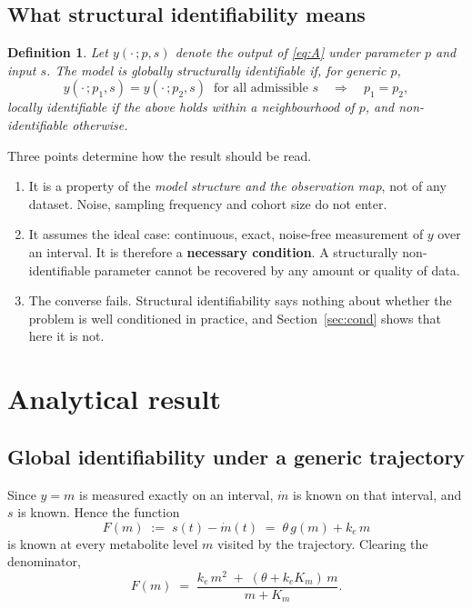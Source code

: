 \documentclass[11pt,a4paper]{article}
\newtheorem{definition}{Definition}
\begin{document}
\subsection{What structural identifiability means}

\begin{definition}
Let $y(\cdot\,; p, s)$ denote the output of \eqref{eq:A} under parameter $p$ and input $s$.
The model is \emph{globally structurally identifiable} if, for generic $p$,
\[
y(\cdot\,; p_1, s) = y(\cdot\,; p_2, s) \ \text{ for all admissible } s
\quad \Longrightarrow \quad p_1 = p_2 ,
\]
\emph{locally identifiable} if the above holds within a neighbourhood of $p$, and
\emph{non-identifiable} otherwise.
\end{definition}

Three points determine how the result should be read.

\begin{enumerate}[leftmargin=*, itemsep=2pt]
\item It is a property of the \emph{model structure and the observation map}, not of any
      dataset. Noise, sampling frequency and cohort size do not enter.
\item It assumes the ideal case: continuous, exact, noise-free measurement of $y$ over an
      interval. It is therefore a \textbf{necessary condition}. A structurally
      non-identifiable parameter cannot be recovered by any amount or quality of data.
\item The converse fails. Structural identifiability says nothing about whether the
      problem is well conditioned in practice, and Section~\ref{sec:cond} shows that here
      it is not.
\end{enumerate}

\section{Analytical result}

\subsection{Global identifiability under a generic trajectory}

Since $y = m$ is measured exactly on an interval, $\dot m$ is known on that interval, and
$s$ is known. Hence the function
\begin{equation}
F(m) \;:=\; s(t) - \dot m(t) \;=\; \theta\, g(m) + k_e\, m
\label{eq:F}
\end{equation}
is known at every metabolite level $m$ visited by the trajectory. Clearing the denominator,
\begin{equation}
F(m) \;=\; \frac{k_e\, m^2 \;+\; (\theta + k_e K_m)\, m}{m + K_m} .
\label{eq:Frational}
\end{equation}
\end{document}
